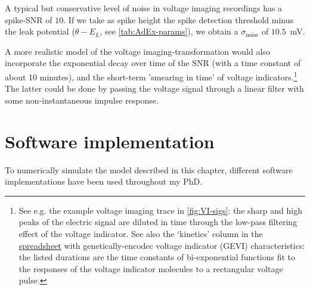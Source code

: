 A typical but conservative level of noise in voltage imaging recordings has a spike-SNR of $10$. If we take as spike height the spike detection threshold minus the leak potential ($θ - E_L$, see \cref{tab:AdEx-params}), we obtain a $σ_\text{noise}$ of $10.5$~mV.

A more realistic model of the voltage imaging-transformation would also incorporate the exponential decay over time of the SNR (with a time constant of about 10 minutes), and the short-term 'smearing in time' of voltage indicators.\footnote{
    See e.g. the example voltage imaging trace in \cref{fig:VI-sigs}: the sharp and high peaks of the electric signal are diluted in time through the low-pass filtering effect of the voltage indicator. See also the `kinetics' column in the  \href{https://docs.google.com/spreadsheets/d/1W9Y3az4i1xdvahpdyqtsTG8F81LXK2T6wzRgsXHN3z0/edit}{spreadsheet} with genetically-encodec voltage indicator (GEVI) characteristics: the listed durations are the time constants of bi-exponential functions fit to the responses of the voltage indicator molecules to a rectangular voltage pulse.
}
The latter could be done by passing the voltage signal through a linear filter with some non-instantaneous impulse response.



\section{Software implementation}
\label{sec:software}

To numerically simulate the model described in this chapter, different software implementations have been used throughout my PhD.


